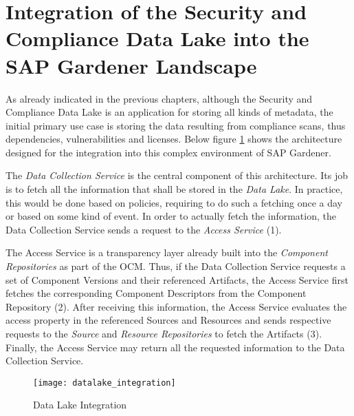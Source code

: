 \section{Integration of the Security and Compliance Data Lake into the SAP Gardener Landscape} \label{sec:Integration of the Security and Compliance Data Lake into the SAP Gardener Landscape}
As already indicated in the previous chapters, although the Security and Compliance Data Lake is an application for storing all kinds of metadata, the initial primary use case is storing the data resulting from compliance scans, thus dependencies, vulnerabilities and licenses. Below figure \ref{fig:DataLakeIntegration} shows the architecture designed for the integration into this complex environment of SAP Gardener.\par 
The \emph{Data Collection Service} is the central component of this architecture. Its job is to fetch all the information that shall be stored in the \emph{Data Lake}. In practice, this would be done based on policies, requiring to do such a fetching once a day or based on some kind of event. In order to actually fetch the information, the Data Collection Service sends a request to the \emph{Access Service} (1).\par
The Access Service is a transparency layer already built into the \emph{Component Repositories} as part of the OCM. Thus, if the Data Collection Service requests a set of Component Versions and their referenced Artifacts, the Access Service first fetches the corresponding Component Descriptors from the Component Repository (2). After receiving this information, the Access Service evaluates the access property in the referenced Sources and Resources and sends respective requests to the \emph{Source} and \emph{Resource Repositories} to fetch the Artifacts (3). Finally, the Access Service may return all the requested information to the Data Collection Service.\par

\begin{figure}[H]
	\centering
	\texttt{[image: datalake\_integration]}
	\caption[Data Lake Integration]{Data Lake Integration }
	\label{fig:DataLakeIntegration}
\end{figure}

